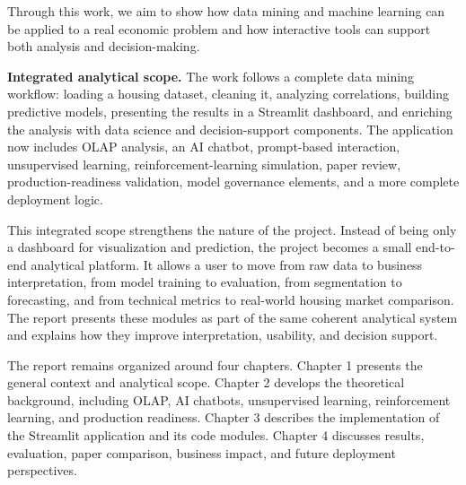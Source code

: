 Through this work, we aim to show how data mining and machine learning can be applied to a real economic problem and how interactive tools can support both analysis and decision-making.

\textbf{Integrated analytical scope.}
The work follows a complete data mining workflow: loading a housing dataset, cleaning it, analyzing correlations, building predictive models, presenting the results in a Streamlit dashboard, and enriching the analysis with data science and decision-support components. The application now includes OLAP analysis, an AI chatbot, prompt-based interaction, unsupervised learning, reinforcement-learning simulation, paper review, production-readiness validation, model governance elements, and a more complete deployment logic.

This integrated scope strengthens the nature of the project. Instead of being only a dashboard for visualization and prediction, the project becomes a small end-to-end analytical platform. It allows a user to move from raw data to business interpretation, from model training to evaluation, from segmentation to forecasting, and from technical metrics to real-world housing market comparison. The report presents these modules as part of the same coherent analytical system and explains how they improve interpretation, usability, and decision support.

The report remains organized around four chapters. Chapter 1 presents the general context and analytical scope. Chapter 2 develops the theoretical background, including OLAP, AI chatbots, unsupervised learning, reinforcement learning, and production readiness. Chapter 3 describes the implementation of the Streamlit application and its code modules. Chapter 4 discusses results, evaluation, paper comparison, business impact, and future deployment perspectives.
